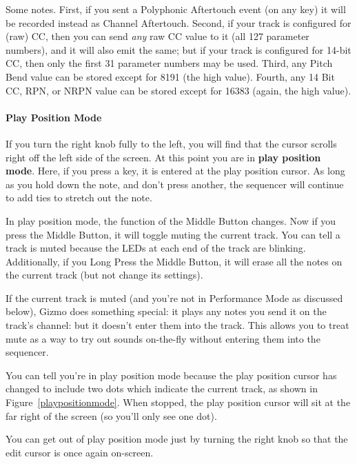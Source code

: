 \documentclass{article}
\begin{document}
Some notes.  First, if you sent a Polyphonic Aftertouch event (on any key) it will be recorded instead as Channel Aftertouch.  Second, if your track is configured for (raw) CC, then you can send {\it any} raw CC value to it (all 127 parameter numbers), and it will also emit the same; but if your track is configured for 14-bit CC, then only the first 31 parameter numbers may be used.  Third, any Pitch Bend value can be stored except for 8191 (the high value).  Fourth, any 14 Bit CC, RPN, or NRPN value can be stored except for 16383 (again, the high value).  

\paragraph{Play Position Mode}

If you turn the right knob fully to the left, you will find that the cursor scrolls right off the left side of the screen.  At this point you are in {\bf play position mode}.  Here, if you press a key, it is entered at the play position cursor.  As long as you hold down the note, and don't press another, the sequencer will continue to add ties to stretch out the note.

In play position mode, the function of the Middle Button changes.  Now if you press the Middle Button, it will toggle muting the current track.  You can tell a track is muted because the LEDs at each end of the track are blinking.  Additionally, if you Long Press the Middle Button, it will erase all the notes on the current track (but not change its settings).

If the current track is muted (and you're not in Performance Mode as discussed below), Gizmo does something special: it plays any notes you send it on the track's channel: but it doesn't enter them into the track. This allows you to treat mute as a way to try out sounds on-the-fly without entering them into the sequencer.

You can tell you're in play position mode because the play position cursor has changed to include two dots which indicate the current track, as shown in Figure~\ref{playpositionmode}.  When stopped, the play position cursor will sit at the far right of the screen (so you'll only see one dot).

You can get out of play position mode just by turning the right knob so that the edit cursor is once again on-screen.
\end{document}
